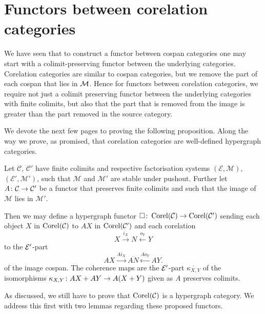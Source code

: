 \section{Functors between corelation categories} \label{sec.corelfunctors}
We have seen that to construct a functor between cospan categories one may start
with a colimit-preserving functor between the underlying categories. Corelation
categories are similar to cospan categories, but we remove the part of each
cospan that lies in $\mathcal M$. Hence for functors between corelation categories,
we require not just a colimit preserving functor between the underlying
categories with finite colimits, but also that the part that is removed from the
image is greater than the part removed in the source category.

We devote the next few pages to proving the following proposition. Along the way
we prove, as promised, that corelation categories are well-defined hypergraph
categories.

\begin{proposition} \label{prop.corelfunctors}
  Let $\mathcal C$, $\mathcal C'$ have finite colimits and respective
  factorisation systems $(\mathcal E, \mathcal M)$, $(\mathcal E', \mathcal M')$,
  such that $\mathcal M$ and $\mathcal M'$ are stable under pushout. Further let
  $A{\colon} \mathcal C \to \mathcal C'$ be a functor that preserves finite colimits
  and such that the image of $\mathcal M$ lies in $\mathcal M'$.

  Then we may define a hypergraph functor $\square{\colon} \operatorname{{Corel}}(\mathcal C) \to
  \operatorname{{Corel}}(\mathcal C')$ sending each object $X$ in $\operatorname{{Corel}}(\mathcal C)$ to $AX$ in
  $\operatorname{{Corel}}(\mathcal C')$ and each corelation 
  \[
    X \stackrel{i_X}{\longrightarrow} N \stackrel{o_Y}{\longleftarrow} Y 
  \]
  to the $\mathcal E'$-part
  \[
    AX \stackrel{Ai_X}{\longrightarrow} \overline{AN}
    \stackrel{Ao_Y}{\longleftarrow} AY.
  \]
  of the image cospan. The coherence maps are the $\mathcal E'$-part
  $\overline{\kappa_{X,Y}}$ of the isomorphisms $\kappa_{X,Y}{\colon} AX+AY \to
  A(X+Y)$ given as $A$ preserves colimits.
\end{proposition}

As discussed, we still have to prove that $\operatorname{{Corel}}(\mathcal C)$ is a hypergraph
category. We address this first with two lemmas regarding these proposed
functors.

